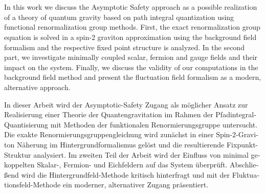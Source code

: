 {\hypersetup{allcolors=black}
\thispagestyle{plain}

\makeatletter

\begin{center}
\textbf{\Large\@title} \\
\vspace{.1cm}
\@author \\
\end{center}

\makeatother

In this work we discuss the Asymptotic Safety approach as a possible realization of a theory of quantum gravity based on path integral quantization using functional renormalization group methods. First, the exact renormalization group equation is solved in a spin-2 graviton approximation using the background field formalism and the respective fixed point structure is analyzed. In the second part, we investigate minimally coupled scalar, fermion and gauge fields and their impact on the system. Finally, we discuss the validity of our computations in the background field method and present the fluctuation field formalism as a modern, alternative approach. 

\vfill

\begin{otherlanguage}{german}
In dieser Arbeit wird der Asymptotic-Safety Zugang als m\"oglicher Ansatz zur Realisierung einer Theorie der Quantengravitation im Rahmen der Pfadintegral-Quantisierung mit Methoden der funktionalen Renormierungsgruppe untersucht. Die exakte Renormierungsgruppengleichung wird zun\"achst in einer Spin-2-Graviton N\"aherung im Hintergrundformalismus gel\"ost und die resultierende Fixpunkt-Struktur analysiert. Im zweiten Teil der Arbeit wird der Einfluss von minimal gekoppelten Skalar-, Fermion- und Eichfeldern auf das System \"uberpr\"uft. Abschlie\ss end wird die Hintergrundfeld-Methode kritisch hinterfragt und mit der Fluktuationsfeld-Methode ein moderner, alternativer Zugang pr\"asentiert.
\end{otherlanguage}
\vfill
\cleardoublepage}
